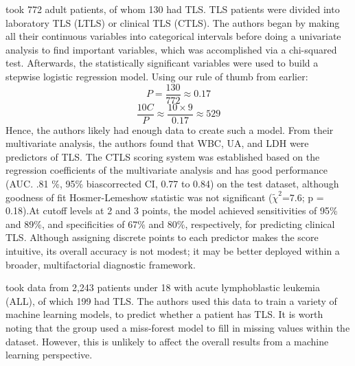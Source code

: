 \documentclass{article}
\begin{document}
\cite{mato2004predictive} took 772 adult patients, of whom 130 had TLS. TLS patients were divided into laboratory TLS (LTLS) or clinical TLS (CTLS). The authors began by making all their continuous variables into categorical intervals before doing a univariate analysis to find important variables, which was accomplished via a chi-squared test. Afterwards, the statistically significant variables were used to build a stepwise logistic regression model. Using our rule of thumb from earlier:
\[P =\frac{130}{772} \approx 0.17 \]
\[ \frac{10C}{P} \approx \frac{10\times9}{0.17} \approx 529 \]
Hence, the authors likely had enough data to create such a model. From their multivariate analysis, the authors found that WBC, UA, and LDH were predictors of TLS. 
The CTLS scoring system was established based on the regression coefficients of the multivariate analysis and has good performance (AUC. .81 \%, 95\% bias\-corrected CI, 0.77 to 0.84) on the test dataset, although goodness of fit Hosmer-Lemeshow statistic was not significant (\(\tilde{\chi}^2\)=7.6; p = 0.18).At cut\-off levels at 2 and 3 points, the model achieved sensitivities of 95\% and 89\%, and specificities of 67\% and 80\%, respectively, for predicting clinical TLS. Although assigning discrete points to each predictor makes the score intuitive, its overall accuracy is not modest; it may be better deployed within a broader, multifactorial diagnostic framework.


\cite{xiao2024prediction} took data from 2,243 patients under 18 with acute lymphoblastic leukemia (ALL), of which 199 had TLS. The authors used this data to train a variety of machine learning models, to predict whether a patient has TLS. It is worth noting that the group used a miss-forest model to fill in missing values within the dataset. However, this is unlikely to affect the overall results from a machine learning perspective.
\end{document}
